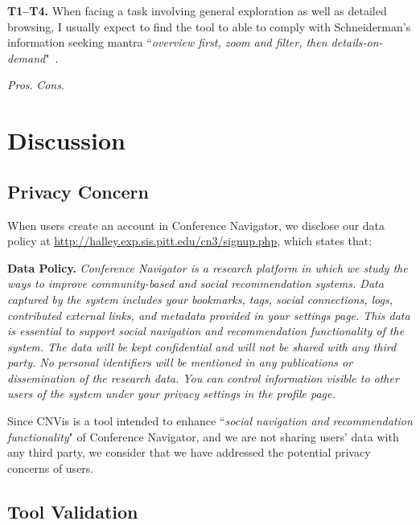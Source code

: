 \documentclass[letterpaper,twocolumn,fleqn]{article}
\begin{document}
{\bf T1--T4.} When facing a task involving general exploration as well as detailed browsing, I usually expect to find the tool to able to comply with Schneiderman's information seeking mantra ``{\em overview first, zoom and filter, then details-on-demand}"~\cite{Smantra-96}.

\textit{Pros}.
\textit{Cons}. 

\section{Discussion}
\label{sec:dis}

\subsection{Privacy Concern}

When users create an account in Conference Navigator, we disclose our data policy at  \url{http://halley.exp.sis.pitt.edu/cn3/signup.php}, which states that:

{\bf Data Policy.} {\it Conference Navigator is a research platform in which we study the ways to improve community-based and social recommendation systems. Data captured by the system includes your bookmarks, tags, social connections, logs, contributed external links, and metadata provided in your settings page. This data is essential to support social navigation and recommendation functionality of the system. The data will be kept confidential and will not be shared with any third party. No personal identifiers will be mentioned in any publications or dissemination of the research data. You can control information visible to other users of the system under your privacy settings in the profile page.}

Since CNVis is a tool intended to enhance ``{\em social navigation and recommendation functionality}" of Conference Navigator, and we are not sharing users' data with any third party, we consider that we have addressed the potential privacy concerns of users.

\subsection{Tool Validation}
\end{document}
